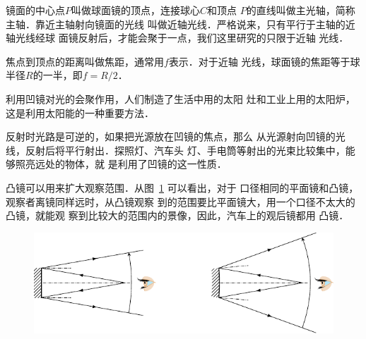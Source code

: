 镜面的中心点$P$叫做球面镜的顶点，连接球心$C$和顶点
$P$的直线叫做主光轴，简称主轴．靠近主轴射向镜面的光线
叫做近轴光线．严格说来，只有平行于主轴的近轴光线经球
面镜反射后，才能会聚于一点，我们这里研究的只限于近轴
光线．

焦点到顶点的距离叫做焦距，通常用$f$表示．对于近轴
光线，球面镜的焦距等于球半径$R$的一半，即$f=R/2$．

利用凹镜对光的会聚作用，人们制造了生活中用的太阳
灶和工业上用的太阳炉，这是利用太阳能的一种重要方法．

反射时光路是可逆的，如果把光源放在凹镜的焦点，那么
从光源射向凹镜的光线，反射后将平行射出．探照灯、汽车头
灯、手电筒等射出的光束比较集中，能够照亮远处的物体，就
是利用了凹镜的这一性质．

凸镜可以用来扩大观察范围．从图~\ref{fig_C_5-15} 可以看出，对于
口径相同的平面镜和凸镜，观察者离镜同样远时，从凸镜观察
到的范围要比平面镜大，用一个口径不太大的凸镜，就能观
察到比较大的范围内的景像，因此，汽车上的观后镜都用
凸镜．

\begin{figure}[htbp]
    \centering
    \includegraphics{fig/C/5-15.pdf}
    \caption{}\label{fig_C_5-15}
\end{figure}

